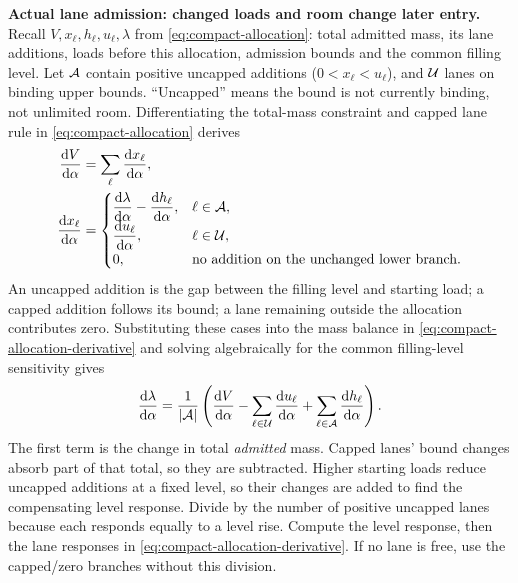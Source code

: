 \documentclass[10pt,a4paper]{article}
\newcommand{\rev}[1]{{\color{revisionred}#1}}
\begin{document}
\textbf{Actual lane admission: changed loads and room change later entry.}
Recall $V,x_\ell,h_\ell,u_\ell,\lambda$ from
\eqref{eq:compact-allocation}: total admitted mass, its lane additions,
loads before this allocation, admission bounds and the common filling
level. Let ${\cal A}$ contain positive uncapped additions
($0<x_\ell<u_\ell$), and ${\cal U}$ lanes on binding upper bounds.
``Uncapped'' means the bound is not currently binding, not unlimited room.
\rev{Differentiating the total-mass constraint and capped lane rule in \eqref{eq:compact-allocation} derives}
\begin{equation}
 \begin{aligned}
 \frac{\mathrm dV}{\mathrm d\alpha}
 &=\sum_\ell\frac{\mathrm dx_\ell}{\mathrm d\alpha},\\
 \frac{\mathrm dx_\ell}{\mathrm d\alpha}
 &=\begin{cases}
 \displaystyle\frac{\mathrm d\lambda}{\mathrm d\alpha}
             -\frac{\mathrm dh_\ell}{\mathrm d\alpha},&\ell\in{\cal A},\\
 \displaystyle\frac{\mathrm du_\ell}{\mathrm d\alpha},&\ell\in{\cal U},\\
 0,&\text{no addition on the unchanged lower branch}.
 \end{cases}
 \end{aligned}
 \label{eq:compact-allocation-derivative}
\end{equation}
An uncapped addition is the gap between the filling level and starting
load; a capped addition follows its bound; a lane remaining outside the
allocation contributes zero. Substituting these cases into the mass
balance in \rev{\eqref{eq:compact-allocation-derivative} and solving algebraically for the common filling-level sensitivity} gives
\begin{equation}
 \frac{\mathrm d\lambda}{\mathrm d\alpha}
 =\frac1{|{\cal A}|}\left(
 \frac{\mathrm dV}{\mathrm d\alpha}
 -\sum_{\ell\in{\cal U}}\frac{\mathrm du_\ell}{\mathrm d\alpha}
 +\sum_{\ell\in{\cal A}}\frac{\mathrm dh_\ell}{\mathrm d\alpha}\right).
 \label{eq:compact-allocation-level-derivative}
\end{equation}
The first term is the change in total \emph{admitted} mass. Capped lanes'
bound changes absorb part of that total, so they are subtracted.
Higher starting loads reduce uncapped additions at a fixed level, so
their changes are added to find the compensating level response.
Divide by the number of positive uncapped lanes because each responds
equally to a level rise. Compute the level response, then the lane
responses in \eqref{eq:compact-allocation-derivative}.
If no lane is free, use the capped/zero branches without this division.
\end{document}
